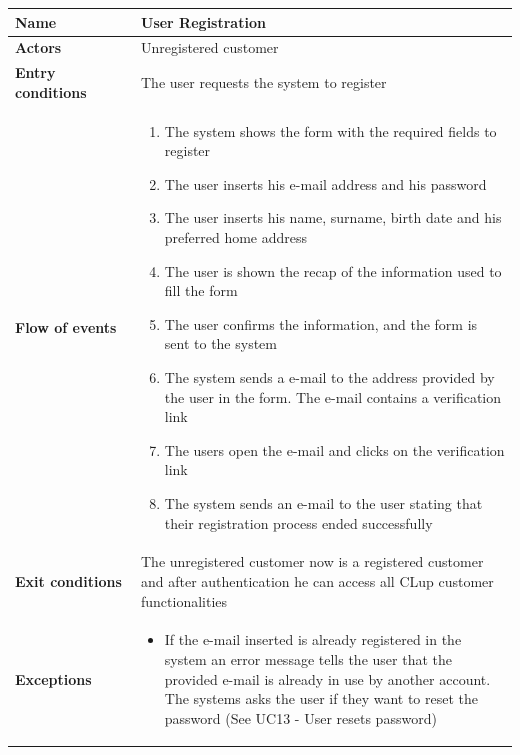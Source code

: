 \begin{longtable}{p{0.25\linewidth}p{0.75\linewidth}}
    \toprule
    \textbf{Name}             & \textbf{User Registration}                                                                                                        \\
    \midrule
    \textbf{Actors}           & Unregistered customer                                                                                                             \\
    \midrule
    \textbf{Entry conditions} & The user requests the system to register                                                                                          \\
    \midrule
    \textbf{Flow of events}   &
    \begin{enumerate}
        \item The system shows the form with the required fields to register
        \item The user inserts his e-mail address and his password
        \item The user inserts his name, surname, birth date and his preferred home address
        \item The user is shown the recap of the information used to fill the form
        \item The user confirms the information, and the form is sent to the system
        \item The system sends a e-mail to the address provided by the user in the form. The e-mail contains a verification link
        \item The users open the e-mail and clicks on the verification link
        \item The system sends an e-mail to the user stating that their registration process ended successfully
    \end{enumerate}                                                                                                                                     \\
    \midrule
    \textbf{Exit conditions}  & The unregistered customer now is a registered customer and after authentication he can access all CLup customer functionalities \\
    \midrule
    \textbf{Exceptions}       &
    \begin{itemize}
        \item If the e-mail inserted is already registered in the system an error message tells the user that the provided e-mail is already in use by another account. The systems asks the user if they want to reset the password (See UC13 - User resets password) %

\end{itemize}
\end{longtable}

